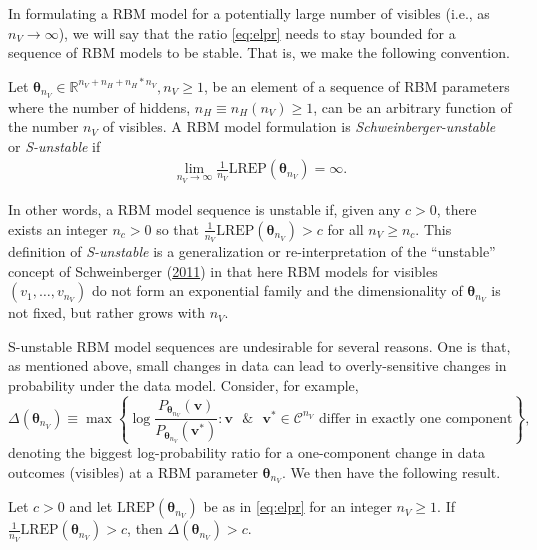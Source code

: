 \documentclass[]{article}
\theoremstyle{definition}
\newcommand{\nv}{{n_{\scriptscriptstyle V}}}
\newcommand{\nh}{{n_{\scriptscriptstyle H}}}
\let\BeginKnitrBlock\begin \let\EndKnitrBlock\end
\begin{document}
In formulating a RBM model for a potentially large number of visibles
(i.e., as \(\nv \rightarrow \infty\)), we will say that the ratio
\eqref{eq:elpr} needs to stay bounded for a sequence of RBM models to be
stable. That is, we make the following convention.
\BeginKnitrBlock{definition}[S-unstable RBM]
\protect\hypertarget{def:unnamed-chunk-1}{}{\label{def:unnamed-chunk-1}
{} }Let
\(\boldsymbol \theta_\nv \in \mathbb{R}^{\nv + \nh + \nh*\nv}, \nv \ge 1\),
be an element of a sequence of RBM parameters where the number of
hiddens, \(\nh \equiv \nh(\nv) \ge 1\), can be an arbitrary function of
the number \(\nv\) of visibles. A RBM model formulation is
\emph{Schweinberger-unstable} or \emph{S-unstable} if \begin{align*}
\lim\limits_{\nv \rightarrow \infty} \frac{1}{\nv} \text{LREP}(\boldsymbol \theta_\nv) = \infty.
\end{align*}
\EndKnitrBlock{definition}

In other words, a RBM model sequence is unstable if, given any
\(c > 0\), there exists an integer \(n_c > 0\) so that
\(\frac{1}{\nv}\text{LREP}(\boldsymbol \theta_\nv) > c\) for all
\(\nv \ge n_c\). This definition of \emph{S-unstable} is a
generalization or re-interpretation of the ``unstable'' concept of
Schweinberger
(\protect\hyperlink{ref-schweinberger2011instability}{2011}) in that
here RBM models for visibles \((v_1, \dots, v_\nv)\) do not form an
exponential family and the dimensionality of \(\boldsymbol \theta_\nv\)
is not fixed, but rather grows with \(\nv\).

S-unstable RBM model sequences are undesirable for several reasons. One
is that, as mentioned above, small changes in data can lead to
overly-sensitive changes in probability under the data model. Consider,
for example, \[
\Delta(\boldsymbol \theta_\nv) \equiv \max \left\{\log \frac{P_{\boldsymbol \theta_\nv}(\boldsymbol v)}{P_{\boldsymbol \theta_\nv}(\boldsymbol v^*)} : \boldsymbol v \text{ }\& \text{ } \boldsymbol v^* \in \mathcal{C}^\nv \text{ differ in exactly one component}\right\},
\] denoting the biggest log-probability ratio for a one-component change
in data outcomes (visibles) at a RBM parameter
\(\boldsymbol \theta_\nv\). We then have the following result.

\BeginKnitrBlock{proposition}
\protect\hypertarget{prp:instab1}{}{\label{prp:instab1} }Let \(c > 0\) and
let \(\text{LREP}(\boldsymbol \theta_\nv)\) be as in \eqref{eq:elpr} for
an integer \(\nv \ge 1\). If
\(\frac{1}{\nv}\text{LREP}(\boldsymbol \theta_\nv) > c\), then
\(\Delta(\boldsymbol \theta_\nv) > c\).
\EndKnitrBlock{proposition}
\end{document}
